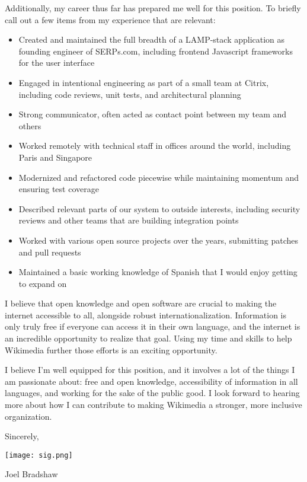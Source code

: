 \documentclass[letterpaper,12pt]{article}
\begin{document}
\begin{paracol}{2}
Additionally, my career thus far has prepared me well for this position. To briefly call out a few items
from my experience that are relevant:
\begin{itemize}
 \item Created and maintained the full breadth of a LAMP-stack application as founding engineer of SERPs.com,
       including frontend Javascript frameworks for the user interface
 \item Engaged in intentional engineering as part of a small team at Citrix, including code reviews, unit tests,
       and architectural planning
 \item Strong communicator, often acted as contact point between my team and others
 \item Worked remotely with technical staff in offices around the world, including Paris and Singapore
 \item Modernized and refactored code piecewise while maintaining momentum and ensuring test coverage
 \item Described relevant parts of our system to outside interests, including security reviews and other
       teams that are building integration points
 \item Worked with various open source projects over the years, submitting patches and pull requests
 \item Maintained a basic working knowledge of Spanish that I would enjoy getting to expand on
\end{itemize}

I believe that open knowledge and open software are crucial to making the internet accessible to all, alongside
robust internationalization. Information is only truly free if everyone can access it in their own language,
and the internet is an incredible opportunity to realize that goal. Using my time and skills to help Wikimedia
further those efforts is an exciting opportunity.

I believe I'm well equipped for this position, and it involves a lot of the things I am passionate about:
free and open knowledge, accessibility of information in all languages, and working for the sake of the public
good. I look forward to hearing more about how I can contribute to making Wikimedia a stronger, more
inclusive organization.

Sincerely,

\texttt{[image: sig.png]}

Joel Bradshaw

\flushpage
\end{paracol}
\end{document}
